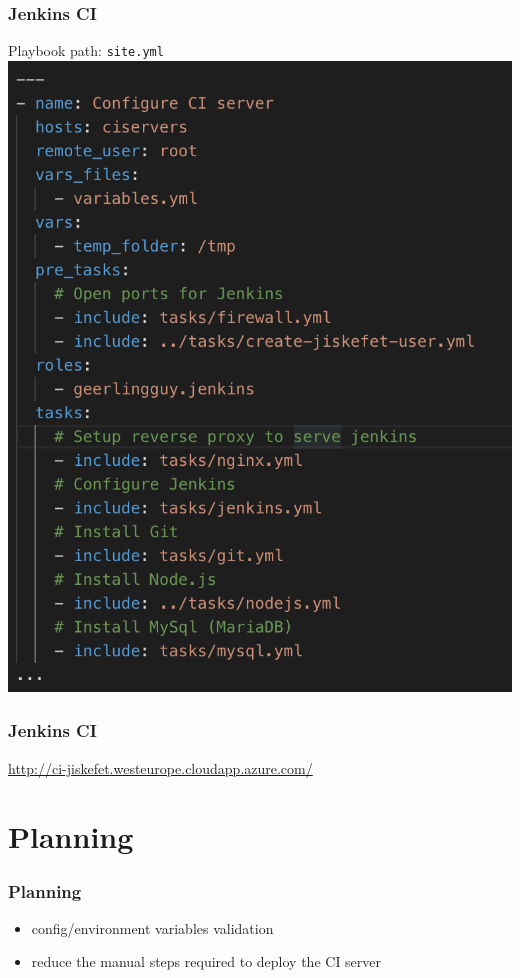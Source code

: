 \documentclass[12pt]{beamer}
\begin{document}
    \begin{frame}
        \frametitle{Jenkins CI}
        Playbook
        \newline
        path: \texttt{site.yml}
        \newline
   		\includegraphics[scale=.35]{assets/deploy_ci.png}
    \end{frame}

    \begin{frame}
        \frametitle{Jenkins CI}
        \href{http://ci-jiskefet.westeurope.cloudapp.azure.com/}{http://ci-jiskefet.westeurope.cloudapp.azure.com/}
    \end{frame}

	\section{Planning}
	\begin{frame}
		\frametitle{Planning}
		\begin{itemize}
            \item config/environment variables validation
            \item reduce the manual steps required to deploy the CI server
		\end{itemize}
    \end{frame}
\end{document}
